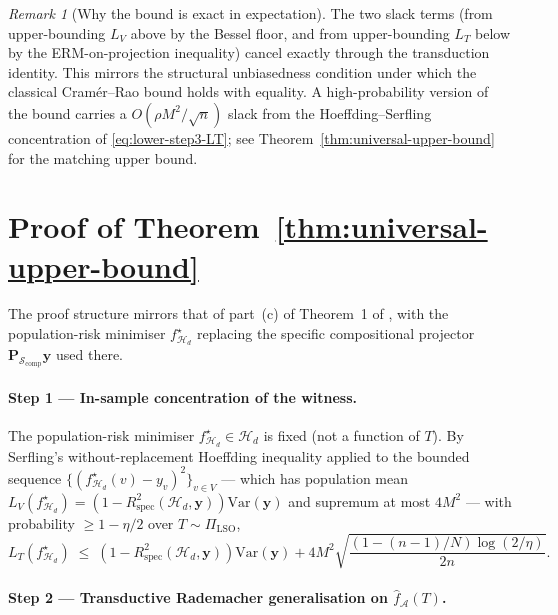 \documentclass[11pt,a4paper]{article}
\theoremstyle{plain}
\theoremstyle{definition}
\theoremstyle{remark}
\newtheorem{remark}[theorem]{Remark}
\newcommand{\by}{\mathbf{y}}
\newcommand{\bP}{\mathbf{P}}
\newcommand{\Var}{\mathrm{Var}}
\newcommand{\Rspec}{R^2_{\mathrm{spec}}}
\newcommand{\Scal}{\mathcal{S}}
\newcommand{\Acal}{\mathcal{A}}
\newcommand{\Hcal}{\mathcal{H}}
\begin{document}
\begin{remark}[Why the bound is exact in expectation]
\label{rem:exact-in-expectation}
The two slack terms (from upper-bounding $L_V$ above by the Bessel
floor, and from upper-bounding $L_T$ below by the ERM-on-projection
inequality) cancel exactly through the transduction identity.  This
mirrors the structural unbiasedness condition under which the classical
Cram\'er--Rao bound holds with equality.  A high-probability version
of the bound carries a $O(\rho M^2/\sqrt{n})$ slack from the
Hoeffding--Serfling concentration of \eqref{eq:lower-step3-LT}; see
Theorem~\ref{thm:universal-upper-bound} for the matching upper bound.
\end{remark}

\section{Proof of Theorem~\ref{thm:universal-upper-bound}}
\label{sec:upper-bound-proof}

The proof structure mirrors that of part~(c) of Theorem~1 of
\citet[][\S 5.2]{FossePallares2026applicabilityBound}, with the
population-risk minimiser $f^\star_{\Hcal_d}$ replacing the specific
compositional projector $\bP_{\Scal_{\mathrm{comp}}}\by$ used there.

\paragraph{Step 1 — In-sample concentration of the witness.}

The population-risk minimiser $f^\star_{\Hcal_d} \in \Hcal_d$ is fixed
(not a function of $T$).  By Serfling's without-replacement Hoeffding
inequality \citep{Serfling1974,BardenetMaillard2015} applied to the
bounded sequence $\{(f^\star_{\Hcal_d}(v) - y_v)^2\}_{v \in V}$ ---
which has population mean $L_V(f^\star_{\Hcal_d}) = (1 -
\Rspec(\Hcal_d, \by))\Var(\by)$ and supremum at most $4 M^2$ --- with
probability $\geq 1 - \eta/2$ over $T \sim \Pi_{\mathrm{LSO}}$,
\begin{equation}
    L_T(f^\star_{\Hcal_d})
    \;\leq\; (1 - \Rspec(\Hcal_d, \by)) \Var(\by)
        + 4 M^2 \sqrt{\frac{(1 - (n-1)/N) \log(2/\eta)}{2 n}}.
    \label{eq:upper-step1-serfling}
\end{equation}

\paragraph{Step 2 — Transductive Rademacher generalisation on $\hat f_\Acal(T)$.}
\end{document}
